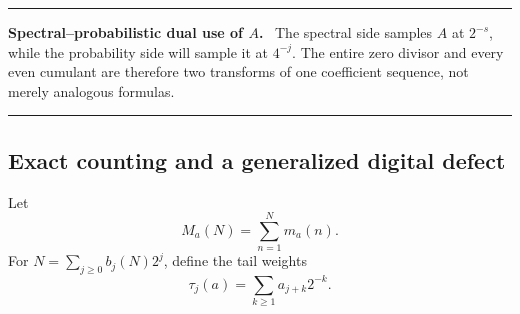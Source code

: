 \documentclass[11pt,oneside]{article}
\numberwithin{equation}{section}
\theoremstyle{definition}
\theoremstyle{remark}
\newenvironment{resultbox}[1]{%
  \par\medskip\noindent\begin{center}\begin{minipage}{0.94\textwidth}%
  \color{deepgreen}\hrule\vspace{0.65em}%
  \color{black}\textbf{\color{deepgreen}#1.}\ }{%
  \par\vspace{0.65em}\color{deepgreen}\hrule
  \end{minipage}\end{center}\medskip}
\begin{document}
\begin{resultbox}{Spectral--probabilistic dual use of $A$}
The spectral side samples $A$ at $2^{-s}$, while the probability side will sample it at
$4^{-j}$.  The entire zero divisor and every even cumulant are therefore two transforms of
one coefficient sequence, not merely analogous formulas.
\end{resultbox}

\subsection{Exact counting and a generalized digital defect}

Let
\begin{equation}
 M_a(N)=\sum_{n=1}^{N}m_a(n).
 \label{p1:eq:M-a}
\end{equation}
For $N=\sum_{j\ge0}b_j(N)2^j$, define the tail weights
\begin{equation}
 \tau_j(a)=\sum_{k\ge1}a_{j+k}2^{-k}.
 \label{p1:eq:tau-j}
\end{equation}
\end{document}
